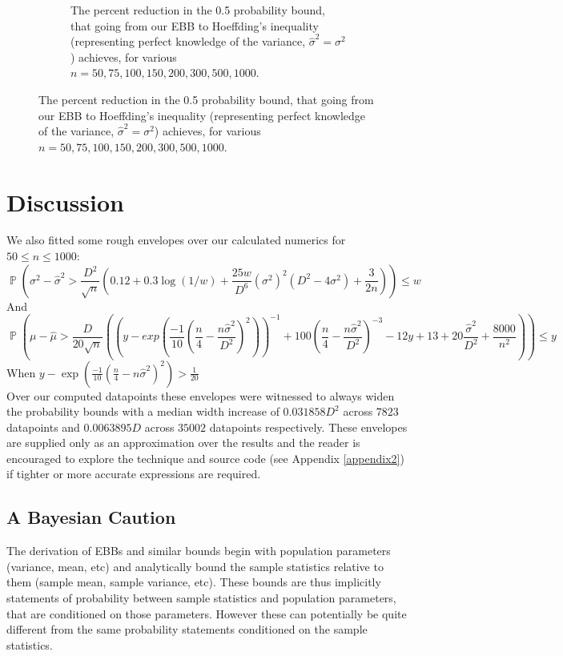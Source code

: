 \documentclass[aap,preprint]{imsart}
\DeclareMathOperator{\p}{\mathbb{P}}
\begin{document}
\begin{figure}[]
\begin{subfigure}[b]{.76\linewidth}
		\caption{The percent reduction in the 0.5 probability bound, that going from our EBB to Hoeffding's inequality (representing perfect knowledge of the variance, $\hat{\sigma}^2=\sigma^2$) achieves, for various $n=50,75,100,150,200,300,500,1000$.}
		\label{biggraph4}
    \end{subfigure}
\end{figure}


\section{Discussion}\label{discussion}
We also fitted some rough envelopes over our calculated numerics for $50\le n\le 1000$:
$$\scriptstyle \p\left(\sigma^2 - \hat{\sigma}^2>\frac{D^2}{\sqrt{n}}\left(0.12+0.3\log(1/w)+\frac{25w}{D^6}(\sigma^2)^2(D^2-4\sigma^2)+\frac{3}{2n}\right)\right) \le w$$
And
$$\scriptstyle \p\left(\mu - \hat{\mu}>\frac{D}{20\sqrt{n}}\left(\left(y-exp\left(\frac{-1}{10}\left(\frac{n}{4}-\frac{n\hat{\sigma}^2}{D^2}\right)^2\right)\right)^{-1}+ 100\left(\frac{n}{4}-\frac{n\hat{\sigma}^2}{D^2}\right)^{-3} -12y+13+20\frac{\hat{\sigma}^2}{D^2} +\frac{8000}{n^2}\right)\right) \le y$$
\hfill When $\scriptstyle y-\exp\left(\frac{-1}{10}(\frac{n}{4}-n\hat{\sigma}^2)^2\right)>\frac{1}{20}$\\

Over our computed datapoints these envelopes were witnessed to always widen the probability bounds with a median width increase of $0.031858D^2$ across $7823$ datapoints and $0.0063895D$ across $35002$ datapoints respectively.
These envelopes are supplied only as an approximation over the results and the reader is encouraged to explore the technique and source code (see Appendix \ref{appendix2}) if tighter or more accurate expressions are required.


 



\subsection{A Bayesian Caution}
The derivation of EBBs and similar bounds begin with population parameters (variance, mean, etc) and analytically bound the sample statistics relative to them (sample mean, sample variance, etc).
These bounds are thus implicitly statements of probability between sample statistics and population parameters, that are conditioned on those parameters.
However these can potentially be quite different from the same probability statements conditioned on the sample statistics.
\end{document}
